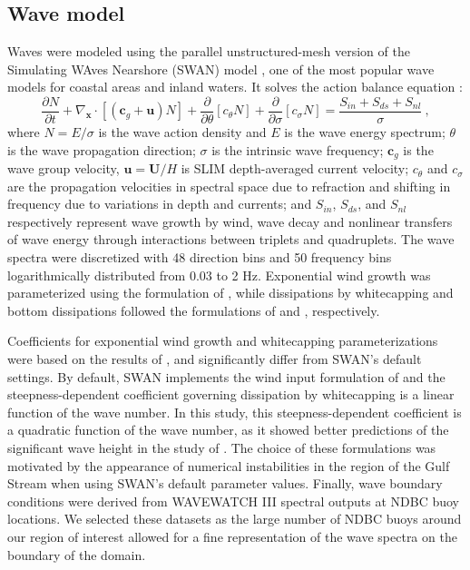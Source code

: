 \documentclass[preprint,12pt,authoryear]{elsarticle}
\begin{document}
\subsection{Wave model}
Waves were modeled using the parallel unstructured-mesh version of the Simulating WAves Nearshore (SWAN) model \citep{booij1999third}, one of the most popular wave models for coastal areas and inland waters. It solves the action balance equation \citep{mei1989applied}:
\begin{equation}
    \dfrac{\partial N}{\partial t} + \nabla_\mathbf{x}\cdot[(\mathbf{c}_g+\mathbf{u})N] + \dfrac{\partial }{\partial \theta}[c_\theta N] + \dfrac{\partial}{\partial \sigma}[c_\sigma N] = \dfrac{S_{in}+S_{ds}+S_{nl}}{\sigma}~, \label{eq:swan}
\end{equation}
where $N=E/\sigma$ is the wave action density and $E$ is the wave energy spectrum; $\theta$ is the wave propagation direction; $\sigma$ is the intrinsic wave frequency; $\mathbf{c}_g$ is the wave group velocity, $\mathbf{u}=\mathbf{U}/H$ is SLIM depth-averaged current velocity; $c_\theta$ and $c_\sigma$ are the propagation velocities in spectral space due to refraction and shifting in frequency due to variations in depth and currents; and $S_{in}$, $S_{ds}$, and $S_{nl}$ respectively represent wave growth by wind, wave decay and nonlinear transfers of wave energy through interactions between triplets and quadruplets. The wave spectra were discretized with 48 direction bins and 50 frequency bins logarithmically distributed from 0.03 to 2 Hz. Exponential wind growth was parameterized using the formulation of \cite{janssen1991quasi}, while dissipations by whitecapping and bottom dissipations followed the formulations of \cite{komen1984existence} and \cite{madsen1989spectral}, respectively.

Coefficients for exponential wind growth and whitecapping parameterizations were based on the results of \cite{siadatmousavi2011evaluation}, and significantly differ from SWAN's default settings. By default, SWAN implements the wind input formulation of \cite{komen1984existence} and the steepness-dependent coefficient governing dissipation by whitecapping is a linear function of the wave number. In this study, this steepness-dependent coefficient is a quadratic function of the wave number, as it showed better predictions of the significant wave height in the study of \cite{siadatmousavi2011evaluation}. The choice of these formulations was motivated by the appearance of numerical instabilities in the region of the Gulf Stream when using SWAN's default parameter values. Finally, wave boundary conditions were derived from WAVEWATCH III \citep{tolman2009user} spectral outputs at NDBC buoy locations. We selected these datasets as the large number of NDBC buoys around our region of interest allowed for a fine representation of the wave spectra on the boundary of the domain. 
\end{document}
